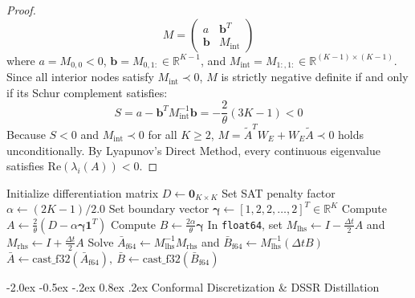 \documentclass[10pt,twocolumn,a4paper]{article}
\makeatletter
\renewcommand\section{\@startsection{section}{1}{\z@}%
  {-2.0ex \@plus -0.5ex \@minus -.2ex}%
  {0.8ex \@plus .2ex}%
  {\normalfont\large\bfseries}}
\theoremstyle{plain}
\theoremstyle{definition}
\makeatother
\begin{document}
\begin{proof}
\begin{equation}
M = \begin{pmatrix} a & \mathbf{b}^T \\ \mathbf{b} & M_{\mathrm{int}} \end{pmatrix}
\end{equation}
where $a = M_{0,0} < 0$, $\mathbf{b} = M_{0, 1:} \in \mathbb{R}^{K-1}$, and $M_{\mathrm{int}} = M_{1:, 1:} \in \mathbb{R}^{(K-1)\times(K-1)}$. Since all interior nodes satisfy $M_{\mathrm{int}} \prec 0$, $M$ is strictly negative definite if and only if its Schur complement satisfies:
\begin{equation}
S = a - \mathbf{b}^T M_{\mathrm{int}}^{-1} \mathbf{b} = -\frac{2}{\theta}(3K - 1) < 0
\end{equation}
Because $S < 0$ and $M_{\mathrm{int}} \prec 0$ for all $K \ge 2$, $M = \tilde{A}^T W_E + W_E \tilde{A} \prec 0$ holds unconditionally. By Lyapunov's Direct Method, every continuous eigenvalue satisfies $\mathrm{Re}(\lambda_i(A)) < 0$.
\end{proof}

\begin{algorithm}[t]
\caption{Analytical CGR Construction \& Tustin Discretization}
\label{alg:cgr_construction}
Initialize differentiation matrix $D \gets \mathbf{0}_{K \times K}$\;
Set SAT penalty factor $\alpha \gets (2K - 1) / 2.0$\;
Set boundary vector $\boldsymbol{\gamma} \gets [1, 2, 2, \dots, 2]^T \in \mathbb{R}^K$\;
Compute $A \gets \frac{2}{\theta}(D - \alpha \boldsymbol{\gamma} \mathbf{1}^T)$\;
Compute $B \gets \frac{2\alpha}{\theta}\boldsymbol{\gamma}$\;
In \texttt{float64}, set $M_{\mathrm{lhs}} \gets I - \frac{\Delta t}{2}A$ and $M_{\mathrm{rhs}} \gets I + \frac{\Delta t}{2}A$\;
Solve $\bar{A}_{\mathrm{f64}} \gets M_{\mathrm{lhs}}^{-1} M_{\mathrm{rhs}}$ and $\bar{B}_{\mathrm{f64}} \gets M_{\mathrm{lhs}}^{-1}(\Delta t B)$\;
\Return $\bar{A} \gets \mathrm{cast\_f32}(\bar{A}_{\mathrm{f64}}),\ \bar{B} \gets \mathrm{cast\_f32}(\bar{B}_{\mathrm{f64}})$\;
\end{algorithm}

\section{Conformal Discretization \& DSSR Distillation}
\end{document}
